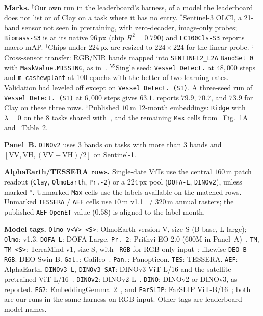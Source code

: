 \begin{table}[!t]
\begin{minipage}{0.99\textwidth}
\textbf{Marks.} $^\dagger$Our own run in the leaderboard's harness, of a model the leaderboard does not list or of Clay on a task where it has no entry. $^\ast$Sentinel-3 OLCI, a 21-band sensor not seen in pretraining, with zero-decoder, image-only probes; \texttt{Biomass-S3} is at its native $96\,\text{px}$ (chip $R^2{=}0.790$) and \texttt{LC100Cls-S3} reports macro mAP. $^\ddagger$Chips under $224\,\text{px}$ are resized to $224\times 224$ for the linear probe. $^\natural$Cross-sensor transfer: RGB/NIR bands mapped into \texttt{SENTINEL2\_L2A} \texttt{BandSet 0} with \texttt{MaskValue.MISSING}, as in~\cite{olmoearth2026v13}. $^\S$Single seed: \texttt{Vessel Detect.} at $48{,}000$ steps and \texttt{m-cashewplant} at 100 epochs with the better of two learning rates. Validation had leveled off except on \texttt{Vessel Detect.\ (S1)}. A three-seed run of \texttt{Vessel Detect.\ (S1)} at $6{,}000$ steps gives $63.1$. \cite{olmoearth2026v13} reports $79.9$, $70.7$, and $73.9$ for Clay on these three rows. $^\diamond$Published $10\,\text{m}$ 12-month embeddings: \texttt{Ridge} with $\lambda{=}0$ on the 8 tasks shared with~\cite{olmoearth2026v13}, and the remaining \texttt{Max} cells from~\cite{brown2025alphaearth} Fig.~1A and~\cite{feng2026tesserav2} Table~2.\par
\textbf{Panel~B.} \texttt{DINOv2} uses 3 bands on tasks with more than 3 bands and $[\text{VV},\text{VH},(\text{VV}{+}\text{VH})/2]$ on Sentinel-1.\par
\textbf{AlphaEarth/TESSERA rows.} Single-date ViTs use the central $160\,\text{m}$ patch readout (\texttt{Clay}, \texttt{OlmoEarth}, \texttt{Pr.-2}) or a $224\,\text{px}$ pool (\texttt{DOFA-L}, \texttt{DINOv2}), unless marked $^\diamond$. Unmarked \texttt{Max} cells use the labels available on the matched rows. Unmarked \texttt{TESSERA} / \texttt{AEF} cells use $10\,\text{m}$ v1.1~\cite{feng2026tessera} / $320\,\text{m}$ annual rasters; the published \texttt{AEF} \texttt{OpenET} value ($0.58$) is aligned to the label month.\par
\textbf{Model tags.} \texttt{Olmo-v<V>-<S>}: OlmoEarth version V, size S (B base, L large); \texttt{Olmo}: v1.3. \texttt{DOFA-L}: DOFA Large. \texttt{Pr.-2}: Prithvi-EO-2.0 (600M in Panel~A)~\cite{szwarcman2026prithvi2}. \texttt{TM}, \texttt{TM-<S>}: TerraMind v1, size S, with \texttt{-RGB} for RGB-only input~\cite{jakubik2025terramind}; likewise \texttt{DEO-B-RGB}: DEO Swin-B. \texttt{Gal.}: Galileo~\cite{tseng2025galileo}. \texttt{Pan.}: Panopticon. \texttt{TES}: TESSERA. \texttt{AEF}: AlphaEarth. \texttt{DINOv3-L}, \texttt{DINOv3-SAT}: DINOv3 ViT-L/16 and the satellite-pretrained ViT-L/16~\cite{simeoni2025dinov3}. \texttt{DINOv2}: DINOv2-L~\cite{oquab2024dinov2}. \texttt{DINO}: DINOv2 or DINOv3, as reported. \texttt{EG2}: EmbeddingGemma~2~\cite{schechtervera2026embeddinggemma2}, and \texttt{FarSLIP}: FarSLIP ViT-B/16~\cite{li2025farslip}; both are our runs in the same harness on RGB input. Other tags are leaderboard model names.\par

\end{minipage}
\end{table}

